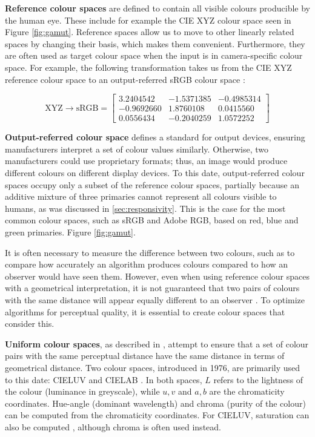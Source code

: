 \textbf{Reference colour spaces} are defined to contain all visible colours producible by the human eye. These include 
for example the CIE XYZ colour space seen in Figure \ref{fig:gamut}. Reference spaces allow us to move to other linearly related spaces by changing their basis, which makes them convenient. Furthermore, they are often used as target colour space when the input is in camera-specific colour space. For example, the following transformation takes us from the CIE XYZ reference colour space to an output-referred sRGB colour space \cite{brucelindbloom}:

\begin{equation}
\text{XYZ} \rightarrow \text{sRGB} = 
\begin{bmatrix}
3.2404542 & -1.5371385 & -0.4985314 \\
-0.9692660 & 1.8760108 & 0.0415560 \\
0.0556434 & -0.2040259 & 1.0572252
\end{bmatrix}
\end{equation}


\textbf{Output-referred colour space} defines a standard for output devices, ensuring manufacturers interpret a set of colour values similarly. Otherwise, two manufacturers could use proprietary formats; thus, an image would produce different colours on different display devices. To this date, output-referred colour spaces occupy only a subset of the reference colour spaces, partially because an additive mixture of three primaries cannot represent all colours visible to humans, as was discussed in \ref{sec:responsivity}. This is the case for the most common colour spaces, such as sRGB and Adobe RGB, based on red, blue and green primaries. Figure \ref{fig:gamut}.

It is often necessary to measure the difference between two colours, such as to compare how accurately an algorithm produces colours compared to how an observer would have seen them. However, even when using reference colour spaces with a geometrical interpretation, it is not guaranteed that two pairs of colours with the same distance will appear equally different to an observer \cite[48-49]{measuringcolour}. To optimize algorithms for perceptual quality, it is essential to create colour spaces that consider this.

\textbf{Uniform colour spaces}, as described in \cite[53-57]{measuringcolour}, attempt to ensure that a set of colour pairs with the same perceptual distance have the same distance in terms of geometrical distance. Two colour spaces, introduced in 1976, are primarily used to this date: CIELUV and CIELAB \cite{cielab}. In both spaces, $L$ refers to the lightness of the colour (luminance in greyscale), while $u,v$ and $a,b$ are the chromaticity coordinates. Hue-angle (dominant wavelength) and chroma (purity of the colour) can be computed from the chromaticity coordinates. For CIELUV, saturation can also be computed \cite[51]{measuringcolour}, although chroma is often used instead.

